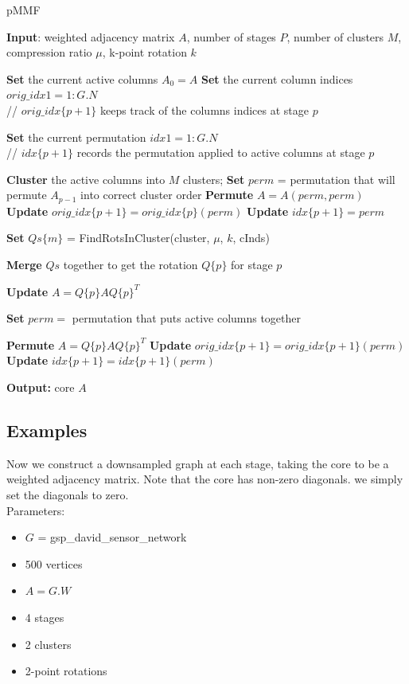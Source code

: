 \documentclass[a4paper]{article}
\begin{document}
\begin{algorithm}[H]
\caption{pMMF}\label{pmmf}
\begin{algorithmic}[1]
\State \textbf{Input}: weighted adjacency matrix $A$, number of stages $P$, number of clusters $M$, compression ratio $\mu$, k-point rotation $k$

\medskip
\State \textbf{Set} the current active columns $A_0 = A$
\State \textbf{Set} the current column indices $orig\_idx{1} = 1:G.N$
\\ \quad\quad // $orig\_idx\{p+1\}$ keeps track of the columns indices at stage $p$ 

\State \textbf{Set} the current permutation $idx{1} = 1:G.N$
\\ \quad\quad // $idx\{p+1\}$ records the permutation applied to active columns at stage $p$ 

\medskip
{}

\State \textbf{Cluster} the active columns into $M$ clusters;
\State \textbf{Set} $perm$ = permutation that will permute $A_{p-1}$ into correct cluster order
\State \textbf{Permute}  $A = A(perm, perm)$
\State \textbf{Update} $orig\_idx\{p+1\} = orig\_idx\{p\}(perm)$ 
\State \textbf{Update} $idx\{p+1\} = perm$

\medskip
{}
\State \textbf{Set} $Qs\{m\}$ = FindRotsInCluster(cluster, $\mu$, $k$, cInds)
\EndFor

\medskip
\State \textbf{Merge} $Qs$ together to get the rotation $Q\{p\}$ for stage $p$

\State \textbf{Update} $A = Q\{p\}AQ\{p\}^T$

\State \textbf{Set} $perm =$ permutation that puts active columns together
 
\State \textbf{Permute} $A = Q\{p\}AQ\{p\}^T$
\State \textbf{Update} $orig\_idx\{p+1\} = orig\_idx\{p+1\}(perm)$
\State \textbf{Update} $idx\{p+1\} = idx\{p+1\}(perm)$

\EndFor

\State \textbf{Output:} core $A$

\end{algorithmic}
\end{algorithm}

\subsection{Examples}

Now we construct a downsampled graph at each stage, taking the core to be a weighted adjacency matrix. Note that the core has non-zero diagonals. we simply set the diagonals to zero. \\
Parameters:
\begin{itemize}
\item $G$ = gsp\_david\_sensor\_network
\item 500 vertices
\item $A = G.W$
\item 4 stages
\item 2 clusters
\item 2-point rotations
\end{itemize}
\end{document}
